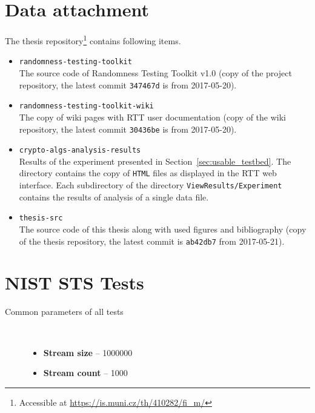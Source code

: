 \documentclass[
	digital,    %
	oneside,    %
	color,
	11pt,
	nocover,
	notable,
	nolof,
	nolot,
]{fithesis3}
\newenvironment{titlemize}[1]
{
	\begin{description}
	\item[#1]\
	\begin{itemize}
}
{
	\end{itemize}
 	\end{description}
}
\theoremstyle{definition}
\theoremstyle{remark}
\begin{document}
\chapter{Data attachment}
\label{app:data_att}
The thesis repository\footnote{Accessible at \url{https://is.muni.cz/th/410282/fi_m/}}  contains following items.
\begin{itemize}
\item \texttt{randomness-testing-toolkit} \\
The source code of Randomness Testing Toolkit v1.0 (copy of the project repository, the latest commit \texttt{347467d} is from 2017-05-20).
\item \texttt{randomness-testing-toolkit-wiki} \\
The copy of wiki pages with RTT user documentation (copy of the wiki repository, the latest commit \texttt{30436be} is from 2017-05-20).
\item \texttt{crypto-algs-analysis-results} \\
Results of the experiment presented in Section~\ref{sec:usable_testbed}. The directory contains the copy of \texttt{HTML} files as displayed in the RTT web interface. Each subdirectory of the directory \texttt{ViewResults/Experiment} contains the results of analysis of a single data file. 
\item \texttt{thesis-src} \\
The source code of this thesis along with used figures and bibliography (copy of the thesis repository, the latest commit is \texttt{ab42db7} from 2017-05-21).
\end{itemize}

\chapter{NIST STS Tests}
\label{app:nist_sts_tests}

\begin{titlemize}{Common parameters of all tests}
\item \textbf{Stream size} -- 1000000
\item \textbf{Stream count} -- 1000
\end{titlemize}
\end{document}
